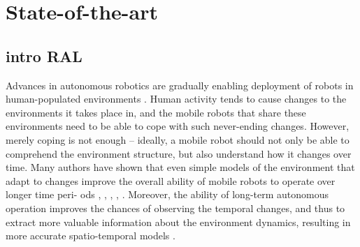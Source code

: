 \section{State-of-the-art}\label{sec:sota}

\subsection{intro RAL}
Advances  in  autonomous  robotics  are  gradually  enabling deployment of robots in human-populated environments \cite{hawes2017strands}.
 Human activity tends to cause changes to the environments it  takes  place  in,  and  the  mobile  robots  that  share  these environments need to be able to cope with such never-ending changes.
 However, merely coping is not enough – ideally, a mobile  robot  should  not  only  be  able  to  comprehend  the environment  structure,  but  also  understand  how  it  changes over time.
 Many authors have shown that even simple models of the environment that adapt to changes improve the overall ability  of  mobile  robots  to  operate  over  longer  time  peri- ods \cite{biber2009experimental}, \cite{tipaldi2013lifelong}, \cite{kucner2013conditional}, \cite{krajnik2017fremen}, \cite{churchill2013experience}.
 Moreover, the ability of long-term autonomous  operation  improves  the  chances  of  observing the  temporal  changes,  and  thus  to  extract  more  valuable information  about  the  environment  dynamics,  resulting  in more accurate spatio-temporal models \cite{hawes2017strands}.

